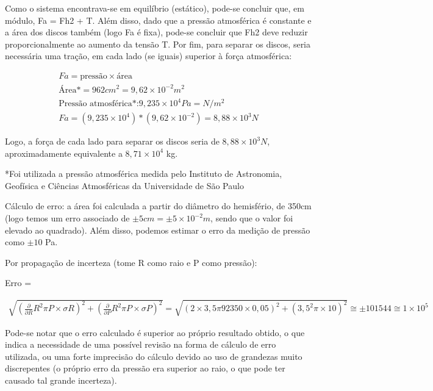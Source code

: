 Como o sistema encontrava-se em equilíbrio (estático), pode-se concluir que, em módulo, Fa = Fh2 + T. Além disso, dado que a pressão atmosférica é constante e a área dos discos também (logo Fa é fixa), pode-se concluir que Fh2 deve reduzir proporcionalmente ao aumento da tensão T. Por fim, para separar os discos, seria necessária uma tração, em cada lado (se iguais) superior à força atmosférica:

\begin{align*}
    Fa = \text{pressão} \times \text{área}\\
    \text{Área*} = 962 cm^2 = 9,62 \times 10^{-2}m^2\\
    \text{Pressão atmosférica*:} 9,235 \times 10^4 Pa = N/m^2\\
    Fa = (9,235 \times 10^4) * (9,62 \times 10^{-2}) = 8,88 \times 10^3 N  
\end{align*}

	Logo, a força de cada lado para separar os discos seria de \(8,88 \times 10^3 N\), aproximadamente equivalente a \(8,71 \times 10^4\) kg.
 
	*Foi utilizada a pressão atmosférica medida pelo Instituto de Astronomia, Geofísica e Ciências Atmosféricas da Universidade de São Paulo %

    
	Cálculo de erro: a área foi calculada a partir do diâmetro do hemisfério, de 350cm (logo temos um erro associado de \(\pm5cm = \pm5\times10^{-2}m\), sendo que o valor foi elevado ao quadrado). Além disso, podemos estimar o erro da medição de pressão como \(\pm 10\) Pa.

	Por propagação de incerteza (tome R como raio e P como pressão):
    
Erro =

\begin{align*}
\sqrt{\left( \frac{\partial }{\partial R} R^{2}\pi P \times\sigma R \right)^{2} + \left( \frac{\partial }{\partial P} R^{2}\pi P \times \sigma P \right)^{2}} =
\sqrt{\left( 2 \times 3,5\pi 92350 \times 0,05 \right)^{2} + \left(3,5^{2}\pi \times 10 \right)^{2}} \cong 
\pm101544  \cong  1 \times 10^5
\end{align*}

Pode-se notar que o erro calculado é superior ao próprio resultado obtido, o que indica a necessidade de uma possível revisão na forma de cálculo de erro utilizada, ou uma forte imprecisão do cálculo devido ao uso de grandezas muito discrepentes (o próprio erro da pressão era superior ao raio, o que pode ter causado tal grande incerteza).


